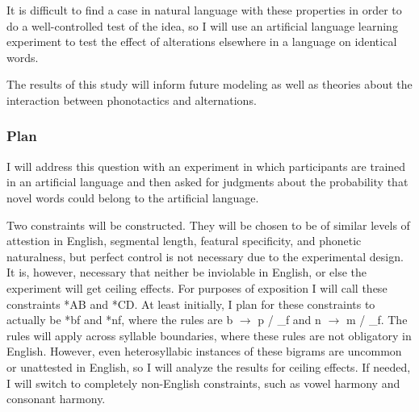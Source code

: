 It is difficult to find a case in natural language with these properties in
order to do a well-controlled test of the idea, so I will use an artificial
language learning experiment to test the effect of alterations elsewhere in a
language on identical words.


The results of this study will inform future modeling as well as theories about
the interaction between phonotactics and alternations.



\subsubsection{Plan}

I will address this question with an experiment in which participants are
trained in an artificial language and then asked for judgments about the probability
that novel words could belong to the artificial language.

Two constraints will be constructed. They will be chosen to be of similar
levels of attestion in English, segmental length, featural specificity, and
phonetic naturalness, but perfect control is not necessary due to the
experimental design. It is, however, necessary that neither be inviolable in
English, or else the experiment will get ceiling effects. For purposes of exposition
I will call these constraints *AB and *CD. At least initially, I plan for these constraints
to actually be *bf and *nf, where the rules are b $\rightarrow$ p / \_f and n $\rightarrow$ m / \_f.
The rules will apply across syllable boundaries, where these rules are not obligatory in English.
However, even heterosyllabic instances of these bigrams are uncommon or unattested in English,
so I will analyze the results for ceiling effects. If needed, I will switch to completely non-English constraints,
such as vowel harmony and consonant harmony.

